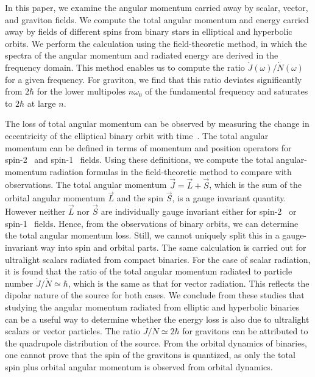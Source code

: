 \documentclass[aps,prd]{revtex4-2}
\begin{document}
 In this paper, we examine the angular momentum carried away by scalar, vector, and graviton fields. We compute the total angular momentum and energy carried away by fields of different spins from binary stars in elliptical and hyperbolic orbits. We perform the calculation using the field-theoretic method, in which the spectra of the angular momentum and radiated energy are derived in the frequency domain.   This method enables us to compute the ratio $\dot{J}(\omega)/\dot{N}(\omega)$ for a given frequency. For graviton, we find that this ratio deviates significantly from $2\hbar$ for the lower multipoles $n \omega_{0}$ of the fundamental frequency and saturates to $2\hbar $ at large $n$. 

The loss of total angular momentum can be observed by measuring the change in eccentricity of the elliptical binary orbit with time~\cite{Peters:1964zz}. The total angular momentum can be defined in terms of momentum and position operators for spin-2~\cite{Maggiore:2007ulw} and spin-1~\cite{Manohar:2022dea} fields.  Using these definitions, we compute the total angular-momentum radiation formulas in the field-theoretic method to compare with observations. The total angular momentum $\vec{J}= \vec{L} + \vec {S}$, which is the sum of the orbital angular momentum $\vec{L}$ and the spin $\vec{S}$, is a gauge invariant quantity. However neither $\vec L$ nor $\vec S$ are individually gauge invariant either for spin-2~\cite{Maggiore:2007ulw} or spin-1~\cite{Manohar:2022dea} fields. Hence, from the observations of binary orbits, we can determine the total angular momentum loss. Still, we cannot uniquely split this in a gauge-invariant way into spin and orbital parts. The same calculation is carried out for ultralight scalars radiated from compact binaries. For the case of scalar radiation, it is found that the ratio of the total angular momentum radiated to particle number $\dot{J}/\dot{N} \simeq \hbar$, which is the same as that for vector radiation. This reflects the dipolar nature of the source for both cases. We conclude from these studies that studying the angular momentum radiated from elliptic and hyperbolic binaries can be a useful way to determine whether the energy loss is also due to ultralight scalars or vector particles.  The ratio $\dot{J}/\dot {N} \simeq 2\hbar $ for gravitons can be attributed to the quadrupole distribution of the source. From the orbital dynamics of binaries, one cannot prove that the spin of the gravitons is quantized, as only the total spin plus orbital angular momentum is observed from orbital dynamics.  
 
\end{document}
